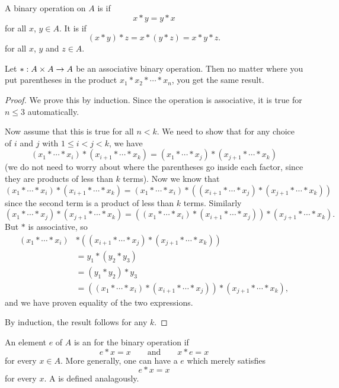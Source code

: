 A binary operation on $A$ is  if
\[
  x \ast y = y \ast x
\]
for all $x$, $y \in A$.
It is  if
\[
  (x \ast y) \ast z = x \ast (y \ast z) = x \ast y \ast z.
\]
for all $x$, $y$ and $z \in A$.

\begin{lemma}
  Let $\ast : A \times A \to A$ be an associative binary operation. Then no
  matter where you put parentheses in the product
  $x_{1} \ast x_{2} \ast \cdots \ast x_{n}$, you get the same result.
\end{lemma}
\begin{proof}
  We prove this by induction.  Since the operation is associative, it is
  true for $n \le 3$ automatically.
  
  Now assume that this is true for all $n < k$.  We need to show that for
  any choice of $i$ and $j$ with $1 \le i < j < k$, we have
  \[
    (x_{1} \ast \cdots \ast x_{i}) \ast (x_{i+1} \ast \cdots \ast x_{k})
    = (x_{1} \ast \cdots \ast x_{j}) \ast (x_{j+1} \ast \cdots \ast x_{k})
  \]
  (we do not need to worry about where the parentheses go inside each factor,
  since they are products of less than $k$ terms).  Now we know that
  \[
    (x_{1} \ast \cdots \ast x_{i}) \ast (x_{i+1} \ast \cdots \ast x_{k})
    = (x_{1} \ast \cdots \ast x_{i}) \ast
    ((x_{i+1} \ast \cdots \ast x_{j}) \ast (x_{j+1} \ast \cdots \ast x_{k}))
  \]
  since the second term is a product of less than $k$ terms.  Similarly
  \[
    (x_{1} \ast \cdots \ast x_{j}) \ast (x_{j+1} \ast \cdots \ast x_{k})
    = ((x_{1} \ast \cdots \ast x_{i}) \ast
    (x_{i+1} \ast \cdots \ast x_{j})) \ast (x_{j+1} \ast \cdots \ast x_{k}).
  \]
  But $\ast$ is associative, so
  \begin{align*}
    (x_{1} \ast \cdots \ast x_{i}) &\ast
    ((x_{i+1} \ast \cdots \ast x_{j}) \ast (x_{j+1} \ast \cdots \ast x_{k}))\\
    &= y_{1} \ast (y_{2} \ast y_{3}) \\
    &= (y_{1} \ast y_{2}) \ast y_{3} \\
    &= ((x_{1} \ast \cdots \ast x_{i}) \ast
    (x_{i+1} \ast \cdots \ast x_{j})) \ast (x_{j+1} \ast \cdots \ast x_{k}),
  \end{align*}
  and we have proven equality of the two expressions.
  
  By induction, the result follows for any $k$.
\end{proof}

An element $e$ of $A$ is an  for the binary operation if
\[
  e \ast x = x \qquad \text{and} \qquad x \ast e = x
\]
for every $x \in A$.  More generally, one can have a 
$e$ which merely satisfies
\[
  e \ast x = x
\]
for every $x$.  A  is defined analagously.

